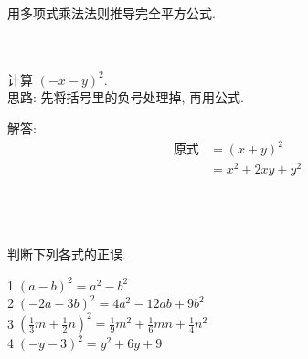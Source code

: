 \begin{comment}
\item {
    已知$100^a=20, 1000^b=50$, 则$a+\frac{3}{2}b-\frac{3}{2}$的值是多少？
    \ifshowSolution
    \fangsong\zihao{4}
    \\
    思路: 观察$100^a, 1000^b$ 发现 $a,b$都出现在指数上, 要求$a+\frac{3}{2}b-\frac{3}{2}$的值, 应该想到尝试把$a+\frac{3}{2}b-\frac{3}{2}$放在指数上.

    解答: 
    \begin{align*}
        100^{a+\frac{3}{2}b-\frac{3}{2}} &= \frac{100^a\cdot 100^{\frac{3}{2}b}}{100^\frac{3}{2}}\\
        &= \frac{100^a\cdot 10^{2\cdot \frac{3}{2}b}}{10^{2\cdot\frac{3}{2}}}\\
        &= \frac{100^a\cdot 10^{3b}} {10^{3}}\\
        &= \frac{100^a\cdot 1000^{b}} {1000}\\
        &= \frac{20\times 50} {1000}\\
        &= 1\\
        &\therefore a+\frac{3}{2}b-\frac{3}{2} = 0.
    \end{align*}
    \else
        \\ \\ \\
    \fi
}
\end{comment}

\item {
    用多项式乘法法则推导完全平方公式.
}
\\ \\ \\

\item {
    计算 $(-x-y)^2$.
    \ifshowSolution
    \fangsong{}
    \\
    思路: 先将括号里的负号处理掉, 再用公式.

    解答: 
    \begin{align*}
        \mbox{原式} &= (x+y)^2\\
        &= x^2 +2xy + y^2
    \end{align*}
    \else
        \\ \\ \\
    \fi
}

\item {
    判断下列各式的正误.

    \textcircled{1}$(a-b)^2 = a^2 - b^2$\\
    \textcircled{2}$(-2a-3b)^2 = 4a^2 - 12ab +9b^2$\\
    \textcircled{3}$(\frac13 m + \frac12 n)^2 = \frac19 m^2 + \frac16 mn + \frac14 n^2$\\
    \textcircled{4}$(-y-3)^2 = y^2 + 6y + 9$
    \\ \\ \\
}

